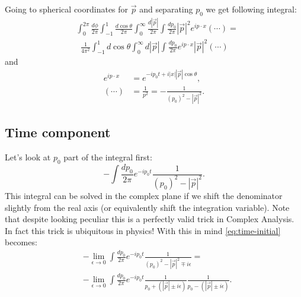 \documentclass[aps,prd,final,twocolumn,floats,floatfix,nofootinbib,10pt]{revtex4-1}
\begin{document}
Going to spherical coordinates for $\vec{p}$ and separating $p_0$ we get following integral:
\begin{align}\label{eq:expanded-integral}
& \int_0^{2 \pi} \frac{d \phi}{2 \pi} \int_{-1}^{1} \frac{d \cos{\theta}}{2 \pi} \int_0^\infty \frac{d |\vec{p}|}{2 \pi}
  \int \frac{d p_0}{2 \pi} |\vec{p}|^2 e^{i p \cdot x} \left( \cdots \right) = \\
& \; \; \frac{1}{4 \pi^2} \int_{-1}^{1} d \cos{\theta} \int_0^\infty d |\vec{p}|
  \int \frac{d p_0}{2 \pi} e^{i p \cdot x} |\vec{p}|^2 \left( \cdots \right)
\end{align}
and
\begin{align}
e^{i p \cdot x} & = e^{-i p_0 t + i |x| |\vec{p}| \cos{\theta}}, \\
\left( \cdots \right) & = \frac{1}{p^2} = -\frac{1}{(p_0)^2 - |\vec{p}|^2}.
\end{align}

\subsection{Time component}

Let's look at $p_0$ part of the integral first:
\begin{equation}\label{eq:time-initial}
-\int \frac{d p_0}{2 \pi} e^{-i p_0 t} \frac{1}{(p_0)^2 - |\vec{p}|^2}.
\end{equation}
This integral can be solved in the complex plane if we shift the denominator slightly from the real axis (or equivalently shift the integration variable). Note that despite looking peculiar this is a perfectly valid trick in Complex Analysis. In fact this trick is ubiquitous in physics! With this in mind \eqref{eq:time-initial} becomes:
\begin{align}
& -\lim_{\epsilon \to 0} \int \frac{d p_0}{2 \pi} e^{-i p_0 t} \frac{1}{(p_0)^2 - |\vec{p}|^2 \mp i \epsilon} = \\
& -\lim_{\epsilon \to 0} \int \frac{d p_0}{2 \pi} e^{-i p_0 t} \frac{1}{p_0 + \left( |\vec{p}| \pm i \epsilon \right)}
  \frac{1}{p_0 - \left(|\vec{p}| \pm i \epsilon \right)} \label{eq:expanded-time}.
\end{align}
\end{document}
